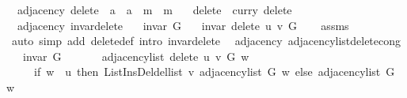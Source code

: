 \begin{isabellebody}
%
\endisatagproof
{\isafoldproof}%
%
\isadelimproof
\isanewline
%
\endisadelimproof
\isanewline
{}\isamarkupfalse%
\ {\isacharparenleft}{\kern0pt}\ adjacency{\isacharparenright}{\kern0pt}\ delete{\isacharprime}{\kern0pt}\ {\isacharcolon}{\kern0pt}{\isacharcolon}{\kern0pt}\ {\isachardoublequoteopen}{\isacharprime}{\kern0pt}a\ {\isasymRightarrow}\ {\isacharprime}{\kern0pt}a\ {\isasymRightarrow}\ {\isacharprime}{\kern0pt}m\ {\isasymRightarrow}\ {\isacharprime}{\kern0pt}m{\isachardoublequoteclose}\ \isanewline
\ \ {\isachardoublequoteopen}delete{\isacharprime}{\kern0pt}\ {\isasymequiv}\ curry\ delete{\isachardoublequoteclose}\isanewline
\isanewline
{}\isamarkupfalse%
\ {\isacharparenleft}{\kern0pt}\ adjacency{\isacharparenright}{\kern0pt}\ invar{\isacharunderscore}{\kern0pt}delete{\isacharprime}{\kern0pt}{\isacharcolon}{\kern0pt}\isanewline
\ \ \ {\isachardoublequoteopen}invar\ G{\isachardoublequoteclose}\isanewline
\ \ \ {\isachardoublequoteopen}invar\ {\isacharparenleft}{\kern0pt}delete{\isacharprime}{\kern0pt}\ u\ v\ G{\isacharparenright}{\kern0pt}{\isachardoublequoteclose}\isanewline
%
\isadelimproof
\ \ %
\endisadelimproof
%
\isatagproof
{}\isamarkupfalse%
\ assms\isanewline
\ \ \isamarkupfalse%
\ {\isacharparenleft}{\kern0pt}auto\ simp\ add{\isacharcolon}{\kern0pt}\ delete{\isacharprime}{\kern0pt}{\isacharunderscore}{\kern0pt}def\ intro{\isacharcolon}{\kern0pt}\ invar{\isacharunderscore}{\kern0pt}delete{\isacharparenright}{\kern0pt}%
\endisatagproof
{\isafoldproof}%
%
\isadelimproof
\isanewline
%
\endisadelimproof
\isanewline
{}\isamarkupfalse%
\ {\isacharparenleft}{\kern0pt}\ adjacency{\isacharparenright}{\kern0pt}\ adjacency{\isacharunderscore}{\kern0pt}list{\isacharunderscore}{\kern0pt}delete{\isacharprime}{\kern0pt}{\isacharunderscore}{\kern0pt}cong{\isacharcolon}{\kern0pt}\isanewline
\ \ \ {\isachardoublequoteopen}invar\ G{\isachardoublequoteclose}\isanewline
\ \ \isanewline
\ \ \ \ {\isachardoublequoteopen}adjacency{\isacharunderscore}{\kern0pt}list\ {\isacharparenleft}{\kern0pt}delete{\isacharprime}{\kern0pt}\ u\ v\ G{\isacharparenright}{\kern0pt}\ w\ {\isacharequal}{\kern0pt}\isanewline
\ \ \ \ \ {\isacharparenleft}{\kern0pt}if\ w\ {\isacharequal}{\kern0pt}\ u\ then\ List{\isacharunderscore}{\kern0pt}Ins{\isacharunderscore}{\kern0pt}Del{\isachardot}{\kern0pt}del{\isacharunderscore}{\kern0pt}list\ v\ {\isacharparenleft}{\kern0pt}adjacency{\isacharunderscore}{\kern0pt}list\ G\ w{\isacharparenright}{\kern0pt}\ else\ adjacency{\isacharunderscore}{\kern0pt}list\ G\ w{\isacharparenright}{\kern0pt}{\isachardoublequoteclose}\isanewline

\end{isabellebody}
